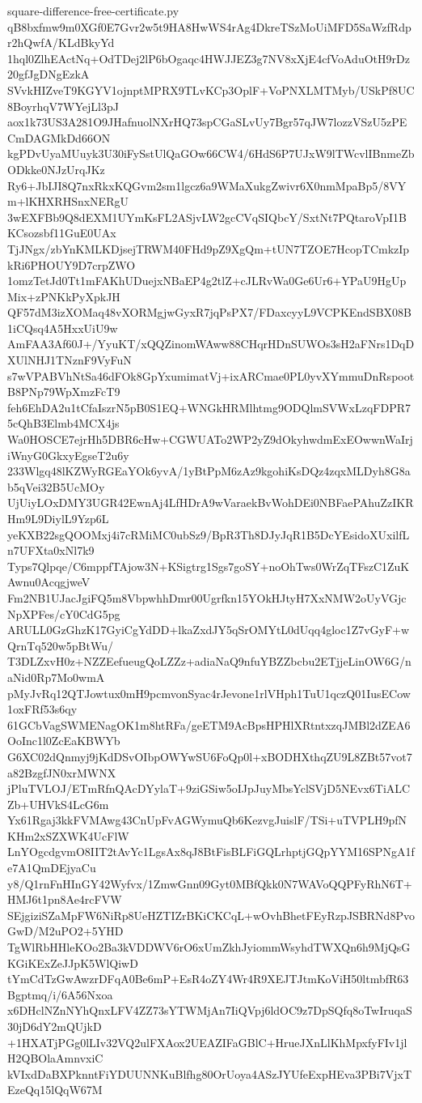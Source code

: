 \documentclass[11pt]{article}
\theoremstyle{definition}
\theoremstyle{remark}
\begin{document}
\begin{filecontents*}[overwrite]{square-difference-free-certificate.py}
qB8bxfmw9m0XGf0E7Gvr2w5t9HA8HwWS4rAg4DkreTSzMoUiMFD5SaWzfRdpr2hQwfA/KLdBkyYd
1hql0ZlhEActNq+OdTDej2lP6bOgaqc4HWJJEZ3g7NV8xXjE4cfVoAduOtH9rDz20gfJgDNgEzkA
SVvkHIZveT9KGYV1ojnptMPRX9TLvKCp3OplF+VoPNXLMTMyb/USkPf8UC8BoyrhqV7WYejLl3pJ
aox1k73US3A281O9JHafnuolNXrHQ73spCGaSLvUy7Bgr57qJW7lozzVSzU5zPECmDAGMkDd66ON
kgPDvUyaMUuyk3U30iFySstUlQaGOw66CW4/6HdS6P7UJxW9lTWcvlIBnmeZbODkke0NJzUrqJKz
Ry6+JbIJI8Q7nxRkxKQGvm2sm1lgcz6a9WMaXukgZwivr6X0nmMpaBp5/8VYm+lKHXRHSnxNERgU
3wEXFBb9Q8dEXM1UYmKsFL2ASjvLW2gcCVqSIQbcY/SxtNt7PQtaroVpI1BKCsozsbf11GuE0UAx
TjJNgx/zbYnKMLKDjsejTRWM40FHd9pZ9XgQm+tUN7TZOE7HcopTCmkzIpkRi6PHOUY9D7crpZWO
1omzTetJd0Tt1mFAKhUDuejxNBaEP4g2tlZ+cJLRvWa0Ge6Ur6+YPaU9HgUpMix+zPNKkPyXpkJH
QF57dM3izXOMaq48vXORMgjwGyxR7jqPsPX7/FDaxcyyL9VCPKEndSBX08B1iCQsq4A5HxxUiU9w
AmFAA3Af60J+/YyuKT/xQQZinomWAww88CHqrHDnSUWOs3sH2aFNrs1DqDXUlNHJ1TNznF9VyFuN
s7wVPABVhNtSa46dFOk8GpYxumimatVj+ixARCmae0PL0yvXYmmuDnRspootB8PNp79WpXmzFcT9
feh6EhDA2u1tCfaIszrN5pB0S1EQ+WNGkHRMlhtmg9ODQlmSVWxLzqFDPR75cQhB3Elmb4MCX4js
Wa0HOSCE7ejrHh5DBR6cHw+CGWUATo2WP2yZ9dOkyhwdmExEOwwnWaIrjiWnyG0GkxyEgseT2u6y
233Wlgq48lKZWyRGEaYOk6yvA/1yBtPpM6zAz9kgohiKsDQz4zqxMLDyh8G8ab5qVei32B5UcMOy
UjUiyLOxDMY3UGR42EwnAj4LfHDrA9wVaraekBvWohDEi0NBFaePAhuZzIKRHm9L9DiylL9Yzp6L
yeKXB22sgQOOMxj4i7cRMiMC0ubSz9/BpR3Th8DJyJqR1B5DcYEsidoXUxilfLn7UFXta0xNl7k9
Typs7Qlpqe/C6mppfTAjow3N+KSigtrg1Sgs7goSY+noOhTws0WrZqTFszC1ZuKAwnu0AcqgjweV
Fm2NB1UJacJgiFQ5m8VbpwhhDmr00Ugrfkn15YOkHJtyH7XxNMW2oUyVGjcNpXPFes/cY0CdG5pg
ARULL0GzGhzK17GyiCgYdDD+lkaZxdJY5qSrOMYtL0dUqq4gloc1Z7vGyF+wQrnTq520w5pBtWu/
T3DLZxvH0z+NZZEefueugQoLZZz+adiaNaQ9nfuYBZZbcbu2ETjjeLinOW6G/naNid0Rp7Mo0wmA
pMyJvRq12QTJowtux0mH9pcmvonSyac4rJevone1rlVHph1TuU1qczQ01IusECow1oxFRf53s6qy
61GCbVagSWMENagOK1m8htRFa/geETM9AcBpsHPHlXRtntxzqJMBl2dZEA6OoInc1l0ZcEaKBWYb
G6XC02dQnmyj9jKdDSvOIbpOWYwSU6FoQp0l+xBODHXthqZU9L8ZBt57vot7a82BzgfJN0xrMWNX
jPluTVLOJ/ETmRfnQAcDYylaT+9ziGSiw5oIJpJuyMbsYclSVjD5NEvx6TiALCZb+UHVkS4LcG6m
Yx61Rgaj3kkFVMAwg43CnUpFvAGWymuQb6KezvgJuislF/TSi+uTVPLH9pfNKHm2xSZXWK4UcFlW
LnYOgcdgvmO8IIT2tAvYc1LgsAx8qJ8BtFisBLFiGQLrhptjGQpYYM16SPNgA1fe7A1QmDEjyaCu
y8/Q1rnFnHInGY42Wyfvx/1ZmwGnn09Gyt0MBfQkk0N7WAVoQQPFyRhN6T+HMJ6t1pn8Ae4rcFVW
SEjgiziSZaMpFW6NiRp8UeHZTIZrBKiCKCqL+wOvhBhetFEyRzpJSBRNd8PvoGwD/M2uPO2+5YHD
TgWlRbHHleKOo2Ba3kVDDWV6rO6xUmZkhJyiommWsyhdTWXQn6h9MjQsGKGiKExZeJJpK5WlQiwD
tYmCdTzGwAwzrDFqA0Be6mP+EsR4oZY4Wr4R9XEJTJtmKoViH50ltmbfR63Bgptmq/i/6A56Nxoa
x6DHclNZnNYhQnxLFV4ZZ73sYTWMjAn7IiQVpj6ldOC9z7DpSQfq8oTwIruqaS30jD6dY2mQUjkD
+1HXATjPGg0lLIv32VQ2ulFXAox2UEAZIFaGBlC+HrueJXnLlKhMpxfyFIv1jlH2QBOlaAmnvxiC
kVIxdDaBXPknntFiYDUUNNKuBlfhg80OrUoya4ASzJYUfeExpHEva3PBi7VjxTEzeQq15lQqW67M

\end{filecontents*}
\end{document}
